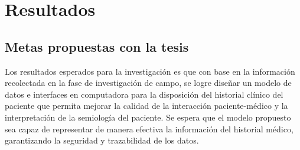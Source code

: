 \section{Resultados}
    \subsection{Metas propuestas con la tesis}
    Los resultados esperados para la investigación es que con base en la información recolectada en la fase de investigación de campo, se logre diseñar un modelo de datos e interfaces en computadora para la disposición del historial clínico del paciente que permita mejorar la calidad de la interacción paciente-médico y la interpretación de la semiología del paciente. Se espera que el modelo propuesto sea capaz de representar de manera efectiva la información del historial médico, garantizando la seguridad y trazabilidad de los datos.